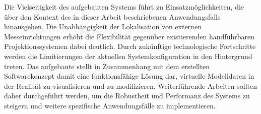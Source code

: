 Die Vielseitigkeit des aufgebauten Systems führt zu Einsatzmöglichkeiten, die über den Kontext des in dieser Arbeit beschriebenen Anwendungsfalls hinausgehen. Die Unabhängigkeit der Lokalisation von externen Messeinrichtungen erhöht die Flexibilität gegenüber existierenden handführbaren Projektionssystemen dabei deutlich. Durch zukünftige technologische Fortschritte werden die Limitierungen der aktuellen Systemkonfiguration in den Hintergrund treten. Das aufgebaute \kps{} stellt in Zusammenhang mit dem erstellten Softwarekonzept damit eine funktionsfähige Lösung dar, virtuelle Modelldaten in der Realität zu visualisieren und zu modifizieren. Weiterführende Arbeiten sollten daher durchgeführt werden, um die Robustheit und Performanz des Systems zu steigern und weitere spezifische Anwendungsfälle zu implementieren.




%
%


